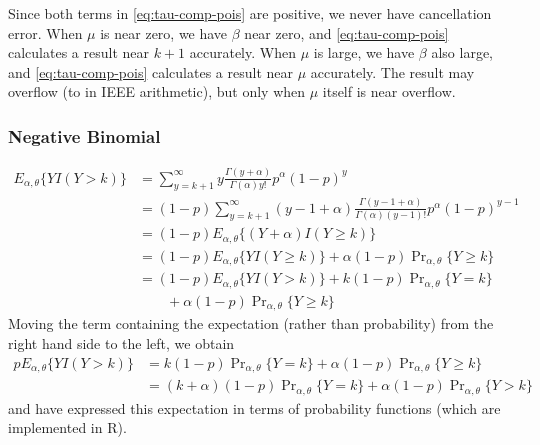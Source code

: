 \documentclass[11pt]{article}
\newcommand{\Prsub}[1]{\Pr\nolimits_{#1}}
\begin{document}
Since both terms in \eqref{eq:tau-comp-pois} are positive, we never have
cancellation error.  When $\mu$ is near zero, we have $\beta$ near zero,
and \eqref{eq:tau-comp-pois} calculates a result near $k + 1$ accurately.
When $\mu$ is large, we have $\beta$ also large,
and \eqref{eq:tau-comp-pois} calculates a result near $\mu$ accurately.
The result may overflow (to \verb@Inf@ in IEEE arithmetic), but only
when $\mu$ itself is near overflow.

\subsubsection{Negative Binomial}

\begin{align*}
   E_{\alpha, \theta} \{ Y I(Y > k) \}
   & =
   \sum_{y = k + 1}^\infty
   y \frac{\Gamma(y + \alpha)}{\Gamma(\alpha) y!} p^\alpha (1 - p)^y
   \\
   & =
   (1 - p)
   \sum_{y = k + 1}^\infty
   (y - 1 + \alpha)
   \frac{\Gamma(y - 1 + \alpha)}{\Gamma(\alpha) (y - 1)!}
   p^\alpha (1 - p)^{y - 1}
   \\
   & =
   (1 - p)
   E_{\alpha, \theta} \{ (Y + \alpha) I(Y \ge k) \}
   \\
   & =
   (1 - p)
   E_{\alpha, \theta} \{ Y I(Y \ge k) \}
   +
   \alpha (1 - p) \Prsub{\alpha, \theta} \{ Y \ge k \}
   \\
   & =
   (1 - p)
   E_{\alpha, \theta} \{ Y I(Y > k) \}
   +
   k (1 - p) \Prsub{\alpha, \theta} \{ Y = k \}
   \\
   & \qquad
   +
   \alpha (1 - p) \Prsub{\alpha, \theta} \{ Y \ge k \}
\end{align*}
Moving the term containing the expectation (rather than probability)
from the right hand side to the left, we obtain
\begin{equation} \label{eq:fred}
\begin{split}
   p E_{\alpha, \theta} \{ Y I(Y > k) \}
   & =
   k (1 - p) \Prsub{\alpha, \theta} \{ Y = k \}
   +
   \alpha (1 - p) \Prsub{\alpha, \theta} \{ Y \ge k \}
   \\
   & =
   (k + \alpha) (1 - p) \Prsub{\alpha, \theta} \{ Y = k \}
   +
   \alpha (1 - p) \Prsub{\alpha, \theta} \{ Y > k \}
\end{split}
\end{equation}
and have expressed this expectation in terms of probability functions
(which are implemented in R).
\end{document}
